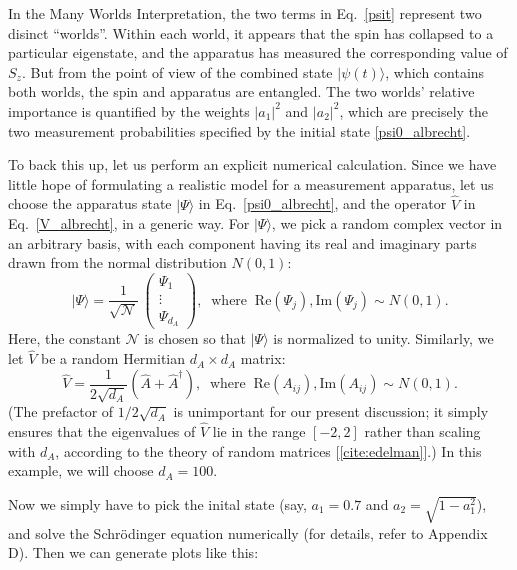 \documentclass[prx,12pt]{revtex4-2}
\begin{document}
In the Many Worlds Interpretation, the two terms in Eq.~\eqref{psit}
represent two disinct ``worlds''.  Within each world, it appears that
the spin has collapsed to a particular eigenstate, and the apparatus
has measured the corresponding value of $S_z$.  But from the point of
view of the combined state $|\psi(t)\rangle$, which contains both
worlds, the spin and apparatus are entangled.  The two worlds'
relative importance is quantified by the weights $|a_1|^2$ and
$|a_2|^2$, which are precisely the two measurement probabilities
specified by the initial state \eqref{psi0_albrecht}.

To back this up, let us perform an explicit numerical calculation.
Since we have little hope of formulating a realistic model for a
measurement apparatus, let us choose the apparatus state
$|\Psi\rangle$ in Eq.~\eqref{psi0_albrecht}, and the operator
$\hat{V}$ in Eq.~\eqref{V_albrecht}, in a generic way.  For
$|\Psi\rangle$, we pick a random complex vector in an arbitrary basis,
with each component having its real and imaginary parts drawn from the
normal distribution $N(0,1)$:
\begin{equation}
  |\Psi\rangle = \frac{1}{\sqrt{\mathcal{N}}}\, \begin{pmatrix}
    \Psi_1 \\ \vdots \\ \Psi_{d_A}
  \end{pmatrix}, \;\; \mathrm{where} \;\; \mathrm{Re}(\Psi_j), \mathrm{Im}(\Psi_j) \sim N(0,1).
\end{equation}
Here, the constant $\mathcal{N}$ is chosen so that $|\Psi\rangle$ is
normalized to unity.  Similarly, we let $\hat{V}$ be a random
Hermitian $d_A\times d_A$ matrix:
\begin{equation}
  \hat{V} = \frac{1}{2\sqrt{d_A}} \left(\hat{A} + \hat{A}^\dagger\right),
  \;\; \mathrm{where} \;\; \mathrm{Re}(A_{ij}), \mathrm{Im}(A_{ij}) \sim N(0,1).
  \label{gue}
\end{equation}
(The prefactor of $1/2\sqrt{d_A}$ is unimportant for our present
discussion; it simply ensures that the eigenvalues of $\hat{V}$ lie in
the range $[-2,2]$ rather than scaling with $d_A$, according to the
theory of random matrices [\ref{cite:edelman}].)  In this example, we
will choose $d_A = 100$.

Now we simply have to pick the inital state (say, $a_1 = 0.7$ and $a_2
= \sqrt{1-a_1^2}$), and solve the Schr\"odinger equation numerically
(for details, refer to Appendix D).  Then we can generate plots like
this:
\end{document}
